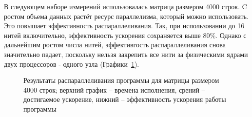 \documentclass[12pt, oneside, a4paper]{article}
\begin{document}
В следующем наборе измерений использовалась матрица размером 4000 строк. C ростом объема данных растёт ресурс параллелизма, который можно использовать. Это повышает эффективность распараллеливания. Так, при использовании до 16 нитей включительно, эффективность ускорения сохраняется выше 80\%. Однако с дальнейшим ростом числа нитей, эффективгость распараллеливания снова значительно падает, поскольку нельзя закрепить все нити за физическими ядрами двух процессоров - одного узла (Графики~\ref{fig:m4000}).

\begin{figure}[h!]
\caption{Результаты распараллеливания программы для матрицы размером 4000 строк; верхний график -- времена исполнения, срений -- достигаемое ускорение, нижний -- эффективность ускорения работы программы}
\label{fig:m4000}
\end{figure}
\end{document}
